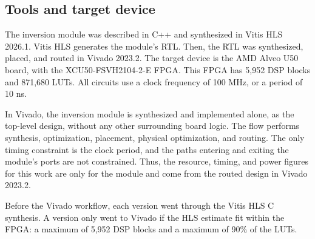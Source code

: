 %   

\subsection{\texorpdfstring{Tools and target device}{Tools and target device}}\label{subsec:hw-ferramentas}
The inversion module was described in C++ and synthesized in Vitis HLS 2026.1. Vitis HLS generates the module's RTL. Then, the RTL was synthesized, placed, and routed in Vivado 2023.2. The target device is the AMD Alveo U50 board, with the XCU50-FSVH2104-2-E FPGA. This FPGA has 5,952 DSP blocks and 871,680 LUTs. All circuits use a clock frequency of 100 MHz, or a period of 10 ns.

In Vivado, the inversion module is synthesized and implemented alone, as the top-level design, without any other surrounding board logic. The flow performs synthesis, optimization, placement, physical optimization, and routing. The only timing constraint is the clock period, and the paths entering and exiting the module's ports are not constrained. Thus, the resource, timing, and power figures for this work are only for the module and come from the routed design in Vivado 2023.2.

Before the Vivado workflow, each version went through the Vitis HLS C synthesis. A version only went to Vivado if the HLS estimate fit within the FPGA: a maximum of 5,952 DSP blocks and a maximum of 90\% of the LUTs.


